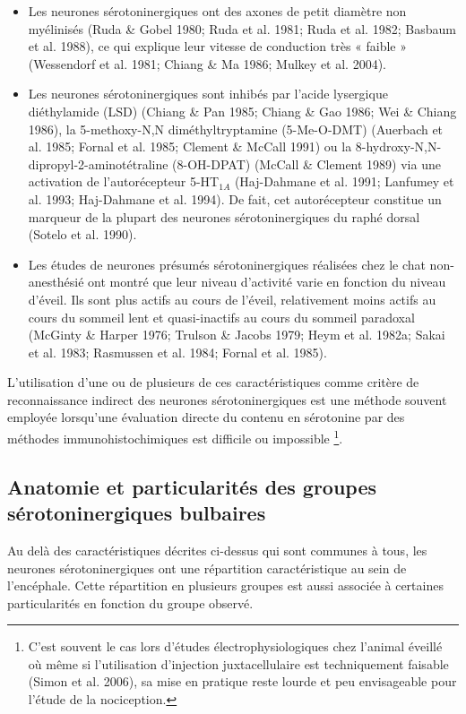 \documentclass[a4paper,12pt,twoside]{report}
\begin{document}
\begin{itemize}
\item Les neurones sérotoninergiques ont des axones de petit diamètre non myélinisés (Ruda \& Gobel 1980; Ruda et al. 1981; Ruda et al. 1982; Basbaum et al. 1988), ce qui explique leur vitesse de conduction très « faible » (Wessendorf et al. 1981; Chiang \& Ma 1986; Mulkey et al. 2004).
\item Les neurones sérotoninergiques sont inhibés par l’acide lysergique diéthylamide (LSD) (Chiang \& Pan 1985; Chiang \& Gao 1986; Wei \& Chiang 1986), la 5-methoxy-N,N diméthyltryptamine (5-Me-O-DMT) (Auerbach et al. 1985; Fornal et al. 1985; Clement \& McCall 1991) ou la 8-hydroxy-N,N-dipropyl-2-aminotétraline (8-OH-DPAT) (McCall \& Clement 1989) via une activation de l’autorécepteur 5-HT$_{1A}$ (Haj-Dahmane et al. 1991; Lanfumey et al. 1993; Haj-Dahmane et al. 1994). De fait, cet autorécepteur constitue un marqueur de la plupart des neurones sérotoninergiques du raphé dorsal (Sotelo et al. 1990).
\item Les études de neurones présumés sérotoninergiques réalisées chez le chat non-anesthésié ont montré que leur niveau d’activité varie en fonction du niveau d’éveil. Ils sont plus actifs au cours de l’éveil, relativement moins actifs au cours du sommeil lent et quasi-inactifs au cours du sommeil paradoxal (McGinty \& Harper 1976; Trulson \& Jacobs 1979; Heym et al. 1982a; Sakai et al. 1983; Rasmussen et al. 1984; Fornal et al. 1985).
\end{itemize}

L’utilisation d’une ou de plusieurs de ces caractéristiques comme critère de reconnaissance indirect des neurones sérotoninergiques est une méthode souvent employée lorsqu’une évaluation directe du contenu en sérotonine par des méthodes immunohistochimiques est difficile ou impossible
\footnote{ C’est souvent le cas lors d’études électrophysiologiques chez l’animal éveillé où même si l’utilisation d’injection juxtacellulaire est techniquement faisable (Simon et al. 2006), sa mise en pratique reste lourde et peu envisageable pour l’étude de la nociception.}.

\subsection{Anatomie et particularités des groupes sérotoninergiques bulbaires}

Au delà des caractéristiques décrites ci-dessus qui sont communes à tous, les neurones sérotoninergiques ont une répartition caractéristique au sein de l’encéphale. Cette répartition en plusieurs groupes est aussi associée à certaines particularités en fonction du groupe observé.
\end{document}
